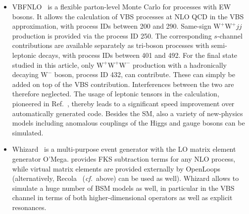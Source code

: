 \documentclass[twocolumn,epjc3]{svjour3} %
\newcommand{\ZM}[1]{{ {\color{green}{ [MZ: #1]}} }}
\newcommand{\PW}{\ensuremath{\text{W}}\xspace}
\begin{document}
\begin{itemize}
      \item {\sc VBFNLO}~\cite{Arnold:2008rz, Arnold:2011wj, Baglio:2014uba} is a flexible
        parton-level Monte Carlo for processes with EW bosons. It
        allows the calculation of VBS processes at NLO QCD in the VBS
        approximation, with process IDs between 200 and 290. Same-sign
        $\PW^+\PW^+jj$ production is provided via the process ID 250. The corresponding
        $s$-channel contributions are available separately as tri-boson processes with
        semi-leptonic decays, with process IDs between 401 and 492. For the
        final state studied in this article, only $\PW^+\PW^+\PW^-$
        production with a hadronically decaying $\PW^-$ boson, process ID 432,
        can contribute. These can simply be added on top of the VBS
        contribution. Interferences between the two are therefore neglected.
        The usage of leptonic tensors in the calculation, pioneered in
        Ref.~\cite{Jager:2006zc}, thereby leads to a significant speed improvement over
        automatically generated code.  Besides the SM, also a variety of
        new-physics models including anomalous couplings of the Higgs and gauge
        bosons can be simulated.

      \item {\sc Whizard}~\cite{Moretti:2001zz,Kilian:2007gr} is a multi-purpose
          event generator with the LO matrix element generator {\sc O'Mega}. \ZM{ if NLO results for this processes cannot be provided, we should skip what follows, or at least clarify the limitations}
    provides FKS subtraction terms for any NLO process, while virtual matrix
    elements are provided externally by {\sc
    OpenLoops}~\cite{Cascioli:2011va} (alternatively, {\sc Recola}~\cite{Actis:2012qn,Actis:2016mpe}
    (\emph{cf.}\ above) can be used as well). {\sc Whizard} allows to simulate a
    huge number of BSM models as well, in particular in
    the VBS channel in terms of both higher-dimensional operators as well as explicit
    resonances.

    \end{itemize}
\end{document}
